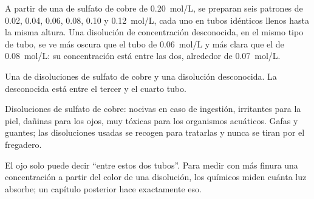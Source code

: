 \begin{example}\label{ex:g10:concentration-and-dilution:scale}
A partir de una  de sulfato de cobre de
\qty{0.20}{mol/L}, se preparan seis patrones de 0.02, 0.04, 0.06, 0.08,
0.10 y \qty{0.12}{mol/L}, cada uno en tubos idénticos llenos hasta la
misma altura. Una disolución de concentración desconocida, en el mismo
tipo de tubo, se ve más oscura que el tubo de \qty{0.06}{mol/L} y más
clara que el de \qty{0.08}{mol/L}: su concentración está entre las dos,
alrededor de \qty{0.07}{mol/L}.
\end{example}

\begin{omfigure}

{\small Una  de disoluciones de sulfato de cobre y una
disolución desconocida. La desconocida está entre el tercer y el cuarto
tubo.}
\end{omfigure}

\begin{safety}{}
Disoluciones de sulfato de cobre: nocivas en caso de ingestión,
irritantes para la piel, dañinas para los ojos, muy tóxicas para los
organismos acuáticos. Gafas y guantes; las disoluciones usadas se
recogen para tratarlas y nunca se tiran por el fregadero.
\end{safety}

\begin{remark}\label{rem:g10:concentration-and-dilution:eye}
El ojo solo puede decir ``entre estos dos tubos''. Para medir con más
finura una concentración a partir del color de una disolución, los
químicos miden cuánta luz absorbe; un capítulo posterior hace
exactamente eso.
\end{remark}

